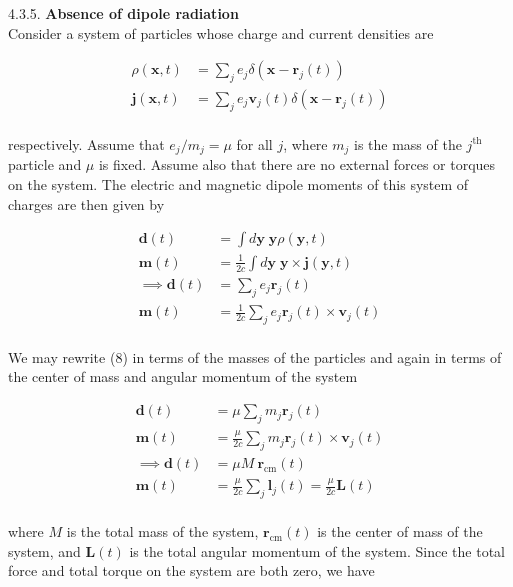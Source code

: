 \documentclass[]{article}
\begin{document}
4.3.5. {\bf Absence of dipole radiation} \\

Consider a system of particles whose charge and current densities are 

\begin{equation}
\begin{split}
\rho(\bm{x} ,t) & = \sum_j e_j \delta(\bm{x} - \bm{r}_j(t)) \\
\bm{j}( \bm{x}, t) & = \sum_j e_j \bm{v}_j (t) \delta(\bm{x} - \bm{r}_j(t)) \\
\end{split}
\end{equation}

respectively. Assume that $e_j/m_j = \mu $ for all $j$, where $m_j$ is the mass of the $j^\text{th}$ particle and $\mu$ is fixed. Assume also that there are no external forces or torques on the system. The electric and magnetic dipole moments of this system of charges are then given by

\begin{equation}
\begin{split}
\bm{d}(t) & = \int d\bm{y} \; \bm{y} \rho(\bm{y} ,t) \\
\bm{m}(t) & = \frac{1}{2c} \int d\bm{y} \; \bm{y} \times \bm{j}(\bm{y} ,t) \\
\implies \bm{d}(t) & =  \sum_j e_j \bm{r}_j(t) \\
\bm{m}(t) & = \frac{1}{2c} \sum_j e_j \bm{r}_j (t) \times  \bm{v}_j (t) \\
\end{split}
\end{equation}

We may rewrite (8) in terms of the masses of the particles and again in terms of the center of mass and angular momentum of the system

\begin{equation}
\begin{split}
\bm{d}(t) & =  \mu \sum_j m_j \bm{r}_j(t) \\
\bm{m}(t) & = \frac{\mu}{2c} \sum_j m_j \bm{r}_j (t) \times  \bm{v}_j (t) \\
\implies \bm{d}(t) & =  \mu M \: \bm{r}_\text{cm}(t) \\
\bm{m}(t) & = \frac{\mu}{2c} \sum_j  \bm{l}_j (t) = \frac{\mu}{2c} \bm{L}(t) \\
\end{split}
\end{equation}

where $M $ is the total mass of the system, $ \bm{r}_\text{cm}(t)$ is the center of mass of the system, and $ \bm{L}(t) $ is the total angular momentum of the system. Since the total force and total torque on the system are both zero, we have
\end{document}
